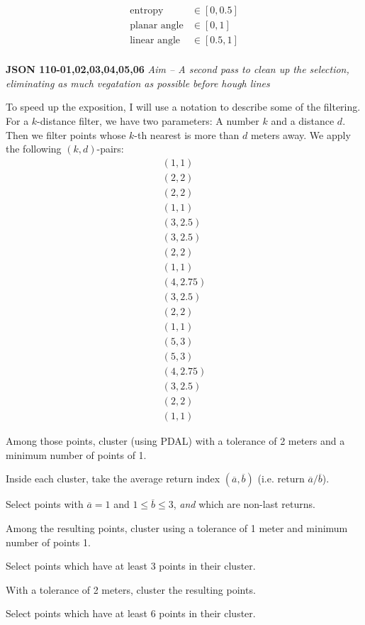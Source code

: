 \documentclass[a4paper,11pt,twoside]{article}
\theoremstyle{definition}
\theoremstyle{remark}
\begin{document}
\begin{list}{}{}
\begin{align*}
\text{entropy}&\in[0,0.5]\\
\text{planar angle}&\in [0,1]\\
\text{linear angle}&\in [0.5,1]\\
\end{align*}
\item \textbf{JSON 110-01,02,03,04,05,06}
\emph{Aim -- A second pass to clean up the selection, eliminating as much vegatation as possible before hough lines}
\item To speed up the exposition, I will use a notation to describe some of the filtering. For a $k$-distance filter, we have two parameters: A number $k$ and a distance $d$. Then we filter points whose $k$-th nearest is more than $d$ meters away. We apply the following $(k,d)$-pairs: 
\begin{align*}
(1,1)\\(2,2)\\(2,2)\\(1,1)\\(3,2.5)\\(3,2.5)\\(2,2)\\(1,1)\\(4,2.75)\\(3,2.5)\\(2,2)\\(1,1)\\(5,3)\\(5,3)\\(4,2.75)\\(3,2.5)\\(2,2)\\(1,1)
\end{align*}
\item Among those points, cluster (using PDAL) with a tolerance of 2 meters and a minimum number of points of 1.
\item Inside each cluster, take the average return index $(\overline a,\overline b)$ (i.e. return $\overline a/\overline b$).
\item Select points with $\overline a=1$ and $1\leqslant \overline b\leqslant 3$, \emph{and} which are non-last returns.
\item Among the resulting points, cluster using a tolerance of 1 meter and minimum number of points 1.
\item Select points which have at least 3 points in their cluster.
\item With a tolerance of 2 meters, cluster the resulting points.
\item Select points which have at least 6 points in their cluster.

\end{list}
\end{document}
